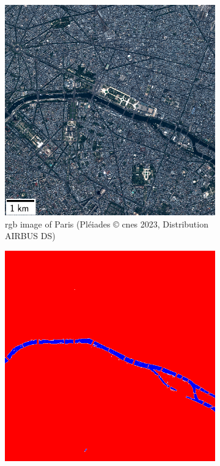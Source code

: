 \begin{figure}
    \centering
    \begin{subfigure}[t]{0.48\linewidth}
        \flushleft
        \includegraphics[width=\linewidth]{Images/Chap_6/miniature_Paris.png}
        \caption{\acrshort{rgb} image of Paris (Pléiades © \acrshort{cnes} 2023, Distribution AIRBUS DS)}
        \label{fig:paris_watermask_1}
    \end{subfigure}\hfill
    \begin{subfigure}[t]{0.48\linewidth}
        \flushright
        \includegraphics[width=\linewidth]{Images/Chap_6/watermask_Paris.png}

\end{subfigure}
\end{figure}
